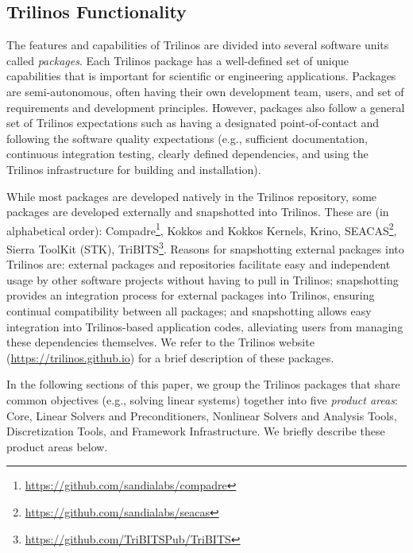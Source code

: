 \subsection{Trilinos Functionality}


The features and capabilities of Trilinos are divided into several software units called \textit{packages}.
Each Trilinos package has a well-defined set of unique capabilities that is important for scientific or engineering applications. Packages are semi-autonomous, often having their own development team, users, and set of requirements and development principles.  However, packages also follow a general set of Trilinos expectations such as having a designated point-of-contact and following the software quality expectations (e.g., sufficient documentation, continuous integration testing, clearly defined dependencies, and using the Trilinos infrastructure for building and installation).

While most packages are developed natively in the Trilinos repository, some packages are developed externally and snapshotted into Trilinos.
These are (in alphabetical order):
Compadre\footnote{\url{https://github.com/sandialabs/compadre}},
Kokkos and Kokkos Kernels,
Krino,
SEACAS\footnote{\url{https://github.com/sandialabs/seacas}},
Sierra ToolKit (STK),
TriBITS\footnote{\url{https://github.com/TriBITSPub/TriBITS}}.
Reasons for snapshotting external packages into Trilinos are:
external packages and repositories facilitate easy and independent usage by other software projects without having to pull in Trilinos;
snapshotting provides an integration process for external packages into Trilinos, ensuring continual compatibility between all packages;
and snapshotting allows easy integration into Trilinos-based application codes, alleviating users from managing these dependencies themselves.
We refer to the Trilinos website (\url{https://trilinos.github.io}) for a brief description of these packages.

In the following sections of this paper, we group the Trilinos packages that share common objectives (e.g., solving linear systems) together into five \textit{product areas}:  Core, Linear Solvers and Preconditioners, Nonlinear Solvers and Analysis Tools, Discretization Tools, and Framework Infrastructure.  We briefly describe these product areas below.

